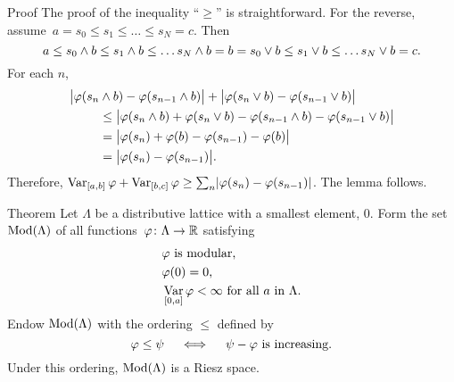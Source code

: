 \documentclass[main.tex]{subfiles}
\begin{document}
\begin{psec*}{Proof}
The proof of the inequality ``$\geq$'' is straightforward.
For the reverse,
assume~$a=s_0\leq s_1 \leq \ldots \leq s_N = c$.
Then
\begin{equation*}
a \leq s_0\wedge b \leq s_1 \wedge b \leq \ldots s_N\wedge b
  = b = s_0 \vee b \leq s_1 \vee b \leq \ldots s_N\vee b = c
\textnormal{.}
\end{equation*}
For each $n$,
\begin{align*}
 \bigl| \varphi(s_n & \wedge b) -\varphi(s_{n-1}\wedge b) \bigr|
       + \bigl| \varphi(s_n \vee b) - \varphi(s_{n-1}\vee b) \bigr|  \\
 & \leq \bigl| \varphi(s_n\wedge b)
       + \varphi(s_n \vee b) 
       -\varphi(s_{n-1}\wedge b) 
       - \varphi(s_{n-1}\vee b) \bigr| \\
 & = \bigl|\varphi(s_n) + \varphi(b) - \varphi(s_{n-1}) -\varphi(b) \bigr| \\
 & = \bigl|\varphi(s_n) - \varphi(s_{n-1})\bigr|
\textnormal{.}
\end{align*}
Therefore,
$\mathop{\mathrm{Var}}_{[a,b]}\varphi + \mathop{\mathrm{Var}}_{[b,c]}\varphi \geq
\smash{\sum_n}|\varphi(s_n)-\varphi(s_{n-1})|$.
The lemma follows.
\end{psec*}
%
%
\begin{psec}{Theorem}
\label{1.10}
Let $\Lambda$ be a distributive lattice with a smallest
element, $0$. 
Form the set~$\mathrm{Mod}(\Lambda)$
of all functions~$\varphi\colon\Lambda\rightarrow\mathbb{R}$ satisfying
\begin{align*}
&\varphi\textnormal{ is modular,} \\
&\varphi(0) = 0\textnormal{, } \\
&\mathop{\mathrm{Var}}_{[0,a]}\varphi < \infty\textnormal{ for all }a\textnormal{ in }\Lambda
\textnormal{.}
\end{align*}
Endow $\mathrm{Mod}(\Lambda)$ with the ordering $\leq$ defined by
\begin{equation*}
\varphi \leq \psi \quad \iff \quad \psi - \varphi\textnormal{ is increasing.}
\end{equation*}
Under this ordering, $\mathrm{Mod}(\Lambda)$ is a Riesz space.
\end{psec}
\end{document}
